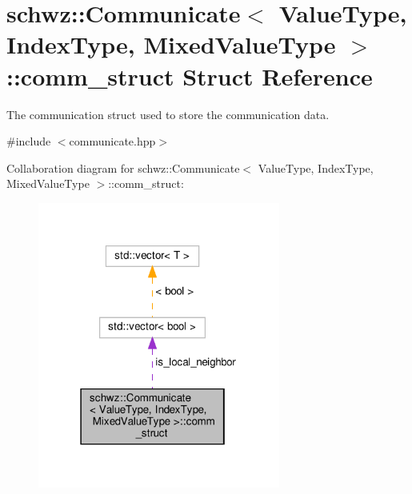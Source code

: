 \hypertarget{structschwz_1_1Communicate_1_1comm__struct}{}\section{schwz\+:\+:Communicate$<$ Value\+Type, Index\+Type, Mixed\+Value\+Type $>$\+:\+:comm\+\_\+struct Struct Reference}
\label{structschwz_1_1Communicate_1_1comm__struct}


The communication struct used to store the communication data.  




{\ttfamily \#include $<$communicate.\+hpp$>$}



Collaboration diagram for schwz\+:\+:Communicate$<$ Value\+Type, Index\+Type, Mixed\+Value\+Type $>$\+:\+:comm\+\_\+struct\+:
\nopagebreak
\begin{figure}[H]
\begin{center}
\leavevmode
\includegraphics[width=226pt]{structschwz_1_1Communicate_1_1comm__struct__coll__graph}
\end{center}
\end{figure}
